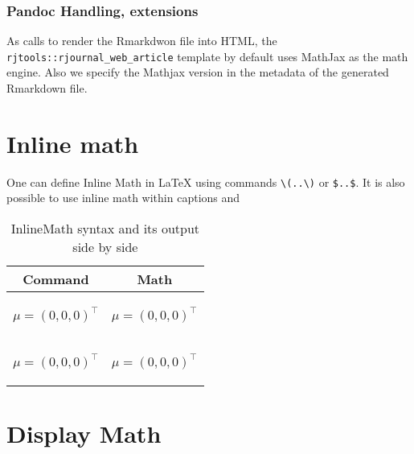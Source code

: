 \subsubsection{Pandoc Handling, extensions}
As  calls  to render the Rmarkdwon file into HTML,
the \verb|rjtools::rjournal_web_article| template by default uses MathJax as the math engine. 
Also we specify the Mathjax version in the metadata of the generated Rmarkdown file.

\section{Inline math}
One can define Inline Math in LaTeX using commands \verb|\(..\)| or \verb|$..$|.
It is also possible to use inline math within captions and  
\begin{table}[htbp]
  \centering
  \begin{tabular}{| c | c |}
  \hline
  Command & Math\\
    \hline
    \begin{minipage}{0.45\textwidth}
\vspace{1mm}
\begin{example}
\(\mu = (0,0,0)^\top \)
\end{example}
    \end{minipage} &
    \begin{minipage}{0.45\textwidth}
    \centering
    \( \mu = (0,0,0)^\top \)
    \end{minipage}\\
    \hline
    
  \begin{minipage}{0.45\textwidth}
\vspace{1mm}
\begin{example}
$\mu = (0,0,0)^\top $
\end{example}
    \end{minipage} &
    \begin{minipage}{0.45\textwidth}
    \centering
    $ \mu = (0,0,0)^\top $
    \end{minipage}\\
    \hline
  \end{tabular}
  \caption{InlineMath syntax and its output side by side}
  \label{table:1}
\end{table}



\section{Display Math}

